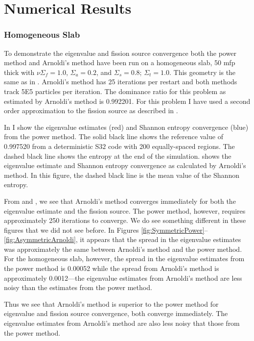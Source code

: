 \section{Numerical Results}
\subsubsection{Homogeneous Slab}
To demonstrate the eigenvalue and fission source convergence both the power method and Arnoldi's method have been run on a homogeneous slab, 50 mfp thick with \mbox{$\nu\Sigma_f = 1.0$}, \mbox{$\Sigma_a = 0.2$}, and \mbox{$\Sigma_s = 0.8$}; \mbox{$\Sigma_t = 1.0$}.  This geometry is the same as in .  Arnoldi's method has 25 iterations per restart and both methods track 5E5 particles per iteration.  The dominance ratio for this problem as estimated by Arnoldi's method is 0.992201.  For this problem I have used a second order approximation to the fission source as described in .

In  I show the eigenvalue estimates (red) and Shannon entropy convergence (blue) from the power method.  The solid black line shows the reference value of 0.997520 from a deterministic S$32$ code with 200 equally-spaced regions. The dashed black line shows the entropy at the end of the simulation.   shows the eigenvalue estimate and Shannon entropy convergence as calculated by Arnoldi's method.  In this figure, the dashed black line is the mean value of the Shannon entropy.  

From  and , we see that Arnoldi's method converges immediately for both the eigenvalue estimate and the fission source.  The power method, however, requires approximately 250 iterations to converge.  We do see something different in these figures that we did not see before.  In Figures \ref{fig:SymmetricPower}--\ref{fig:AsymmetricArnoldi}, it appears that the spread in the eigenvalue estimates was approximately the same between Arnoldi's method and the power method.  For the homogeneous slab, however, the spread in the eigenvalue estimates from the power method is 0.00052 while the spread from Arnoldi's method is approximately 0.0012---the eigenvalue estimates from Arnoldi's method are less noisy than the estimates from the power method.

Thus we see that Arnoldi's method is superior to the power method for eigenvalue and fission source convergence, both converge immediately.  The eigenvalue estimates from Arnoldi's method are also less noisy that those from the power method.

